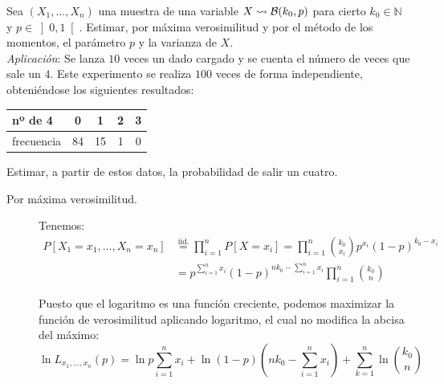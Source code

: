 \begin{ejercicio}
    Sea $(X_1, \ldots, X_n)$ una muestra de una variable $X\rightsquigarrow \mathcal{B}(k_0,p)$ para cierto $k_0\in \mathbb{N}$ y $p\in \left]0,1\right[$. Estimar, por máxima verosimilitud y por el método de los momentos, el parámetro $p$ y la varianza de $X$.\\

    \noindent
    \textit{Aplicación}: Se lanza $10$ veces un dado cargado y se cuenta el número de veces que sale un $4$. Este experimento se realiza $100$ veces de forma independiente, obteniéndose los siguientes resultados:
    \begin{table}[H]
    \centering
    \begin{tabular}{l|cccc}
        nº de 4 & 0 & 1 & 2 & 3 \\
        \hline
        frecuencia & 84 & 15 & 1 & 0
    \end{tabular}
    \end{table}
    \noindent
    Estimar, a partir de estos datos, la probabilidad de salir un cuatro.\\

    \begin{description}
        \item [Por máxima verosimilitud.] 
            Tenemos:
            \begin{align*}
                P[X_1 =x_1, \ldots, X_n = x_n] &\stackrel{\text{iid.}}{=}\prod_{i=1}^{n} P[X=x_i] = \prod_{i=1}^{n} \binom{k_0}{x_i} p^{x_i}{(1-p)}^{k_0-x_i} \\ &= p^{\sum\limits_{i=1}^{n}x_i}{(1-p)}^{nk_0-\sum\limits_{i=1}^{n}x_i} \prod_{i=1}^{n}\binom{k_0}{n}
            \end{align*}
            
            Puesto que el logaritmo es una función creciente, podemos maximizar la función de verosimilitud aplicando logaritmo, el cual no modifica la abcisa del máximo:
            \begin{equation*}
                \ln L_{x_1,\ldots,x_n}(p) = \ln p \sum_{i=1}^{n}x_i + \ln(1-p)\left(nk_0 - \sum_{i=1}^{n}x_i\right) + \sum_{k=1}^{n}\ln\binom{k_0}{n}
            \end{equation*}
            

\end{description}
\end{ejercicio}
